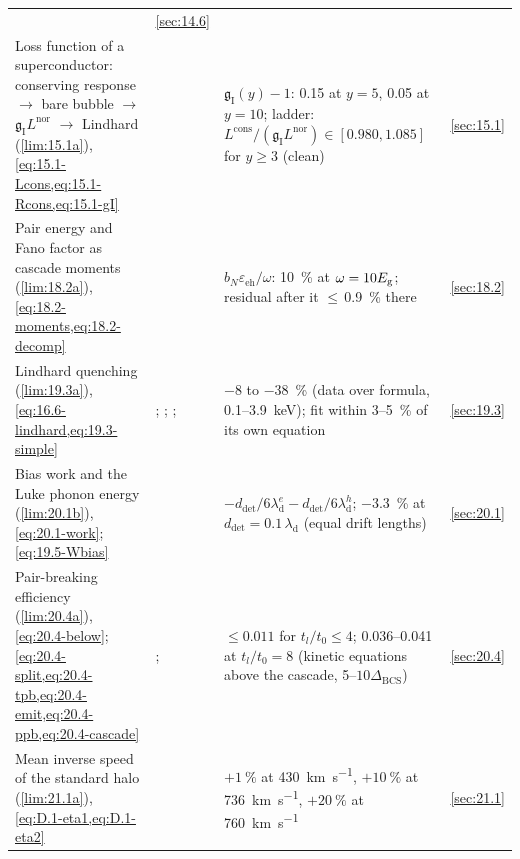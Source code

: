 {\begin{longtable}{@{}>{\raggedright\arraybackslash}p{}>{\raggedright\arraybackslash}p{}>{\raggedright\arraybackslash}p{}>{\raggedright\arraybackslash}p{}@{}}
& \cref{sec:14.6} \\
Loss function of a superconductor: conserving response $\to$ bare bubble $\to$ $\mathfrak{g}_{\mathrm{I}}L^{\mathrm{nor}}$ $\to$ Lindhard (\cref{lim:15.1a}), \cref{eq:15.1-Lcons,eq:15.1-Rcons,eq:15.1-gI}
& \cites[Eqs.~(1), (S.13)]{hochberg2021determining}[Eq.~(3.4)]{hochberg2016detecting}[Eqs.~(8)--(10)]{gan2026mean}[Eq.~(2) and text]{hochberg2023directional}
& $\mathfrak{g}_{\mathrm{I}}(y) - 1$: 0.15 at $y = 5$, 0.05 at $y = 10$; ladder: $L^{\mathrm{cons}}/(\mathfrak{g}_{\mathrm{I}}L^{\mathrm{nor}}) \in [0.980, 1.085]$ for $y \ge 3$ (clean)
& \cref{sec:15.1} \\
Pair energy and Fano factor as cascade moments (\cref{lim:18.2a}), \cref{eq:18.2-moments,eq:18.2-decomp}
& \cite[Eqs.~(2)--(3)]{ramanathan2020ionization}
& $b_N\varepsilon_{\mathrm{eh}}/\omega$: \SI{10}{\percent} at $\omega = 10E_{\mathrm{g}}$; residual after it $\le$\,\SI{0.9}{\percent} there
& \cref{sec:18.2} \\
Lindhard quenching (\cref{lim:19.3a}), \cref{eq:16.6-lindhard,eq:19.3-simple}
& \cite[Eqs.~(3)--(7)]{sarkis2020study}; \cite[Eqs.~(5)--(7)]{sorensen2015atomic}; \cite[Eq.~(3)]{agnese2018nuclear}; \cite{lindhard1963integral,lewin1996review}
& $-$8 to $-$\SI{38}{\percent} (data over formula, 0.1--\SI{3.9}{keV}); fit within 3--\SI{5}{\percent} of its own equation
& \cref{sec:19.3} \\
Bias work and the Luke phonon energy (\cref{lim:20.1b}), \cref{eq:20.1-work}; \cref{eq:19.5-Wbias}
& \cite[Eq.~(1)]{agnese2018nuclear}
& $-d_{\mathrm{det}}/6\lambda_{\mathrm{d}}^e - d_{\mathrm{det}}/6\lambda_{\mathrm{d}}^h$; $-$\SI{3.3}{\percent} at $d_{\mathrm{det}} = 0.1\,\lambda_{\mathrm{d}}$ (equal drift lengths)
& \cref{sec:20.1} \\
Pair-breaking efficiency (\cref{lim:20.4a}), \cref{eq:20.4-below}; \cref{eq:20.4-split,eq:20.4-tpb,eq:20.4-emit,eq:20.4-ppb,eq:20.4-cascade}
& \cite[pp.~2, 5, Fig.~4]{guruswamy2014quasiparticle}; \cite{kaplan1976quasiparticle}
& $\le 0.011$ for $t_l/t_0 \le 4$; 0.036--0.041 at $t_l/t_0 = 8$ (kinetic equations above the cascade, 5--$10\Delta_{\mathrm{BCS}}$)
& \cref{sec:20.4} \\
Mean inverse speed of the standard halo (\cref{lim:21.1a}), \cref{eq:D.1-eta1,eq:D.1-eta2}
& \cite[Eqs.~(B.4), (B.5)]{essig2016direct}
& $+\SI{1}{\percent}$ at \SI{430}{km.s^{-1}}, $+\SI{10}{\percent}$ at \SI{736}{km.s^{-1}}, $+\SI{20}{\percent}$ at \SI{760}{km.s^{-1}}
& \cref{sec:21.1} \\
\end{longtable}
}
